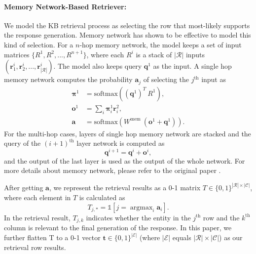\documentclass[11pt,a4paper]{article}
\DeclareMathOperator*{\argmax}{argmax}
\begin{document}
\paragraph{Memory Network-Based Retriever:}
We model the KB retrieval process as selecting the row that
most-likely supports the response generation.
Memory network \cite{sukhbaatar2015end} has shown to be effective to
model this kind of selection.
For a $n$-hop memory network,
the model keeps a set of input matrices $\{R^{1}, R^{2}, ..., R^{n+1}\}$,
where each $R^{i}$ is a stack of $|\mathcal{R}|$ inputs $(\mathbf{r}^{i}_1, \mathbf{r}^{i}_2, ..., \mathbf{r}^{i}_{|\mathcal{R}|})$.
The model also keeps query $\mathbf{q}^{1}$ as the input.
A single hop memory network
computes the probability $\mathbf{a}_j$ of selecting 
the $j^{\text{th}}$ input as
\begin{align*}
\boldsymbol{\pi}^{1} & = \text{softmax}((\mathbf{q}^{1})^{T}\ R^{1}), \\
\mathbf{o}^{1} & = \sum_i \boldsymbol{\pi}^{1}_i \mathbf{r}^{2}_i, \\
\mathbf{a} & =  \text{softmax}{(W^{\text{mem}} \ (\mathbf{o}^{1} + \mathbf{q}^{1}))}.
\end{align*}
For the multi-hop cases, layers of single hop memory network
are stacked and the query of the $(i+1)^{\text{th}}$ layer network
is computed as 
\[\mathbf{q}^{i+1} = \mathbf{q}^{i} + \mathbf{o}^{i},\]
and the output of the last layer is used
as the output of the whole network.
For more details about memory network, please refer to the original paper \cite{sukhbaatar2015end}.

After getting $\mathbf{a}$, we represent the retrieval results
as a 0-1 matrix $T \in \{0, 1\}^{|\mathcal{R}|\times \mathcal{|C|}}$, where each element in $T$
is calculated as
\begin{equation}\label{eq:decode}
T_{j, *} = \mathds{1}[j = \argmax_i \mathbf{a}_i].
\end{equation}
In the retrieval result, $T_{j, k}$ indicates whether the entity in the $j^{\text{th}}$ row and the $k^{\text{th}}$
column is relevant to the final generation of the response.
In this paper, we further flatten T to a 0-1 vector $\mathbf{t} \in \{0, 1\}^{|\mathcal{E}|}$ (where $|\mathcal{E}|$ equals $|\mathcal{R}|\times \mathcal{|C|}$) as our retrieval row results.
\end{document}

